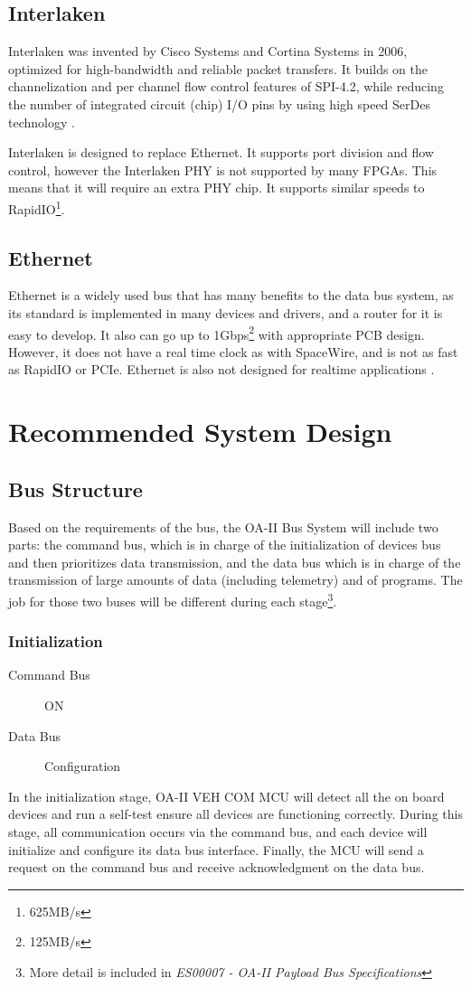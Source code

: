 \documentclass[12pt,article]{memoir}
\begin{document}
\section{Interlaken}
Interlaken was invented by Cisco Systems and Cortina Systems in 2006, optimized for high-bandwidth and reliable packet transfers. It builds on the channelization and per channel flow control features of SPI-4.2, while reducing the number of integrated circuit (chip) I/O pins by using high speed SerDes technology \cite{blog:Interlaken}.\par
Interlaken is designed to replace Ethernet. It supports port division and flow control, however the Interlaken PHY is not supported by many FPGAs. This means that it will require an extra PHY chip. It supports similar speeds to RapidIO\footnote{625MB/s}.

\section{Ethernet}
Ethernet is a widely used bus that has many benefits to the data bus system, as its standard is implemented in many devices and drivers, and a router for it is easy to develop. It also can go up to 1Gbps\footnote{125MB/s} with appropriate PCB design. However, it does not have a real time clock as with SpaceWire, and is not as fast as RapidIO or PCIe. Ethernet is also not designed for realtime applications \cite{blog:Ethernet}.

\newpage
\chapter{Recommended System Design}
\section{Bus Structure}
Based on the requirements of the bus, the OA-II Bus System will include two parts: the command bus, which is in charge of the initialization of devices bus and then prioritizes data transmission, and the data bus which is in charge of the transmission of large amounts of data (including telemetry) and of programs. The job for those two buses will be different during each stage\footnote{More detail is included in \textit{ES00007 - OA-II Payload Bus Specifications}}.
\subsection{Initialization}
\begin{description}
	\item[Command Bus] ON
	\item[Data Bus] Configuration
\end{description}
In the initialization stage, OA-II VEH COM MCU will detect all the on board devices and run a self-test ensure all devices are functioning correctly. During this stage, all communication occurs via the command bus, and each device will initialize and configure its data bus interface. Finally, the MCU will send a request on the command bus and receive acknowledgment on the data bus.
\end{document}
